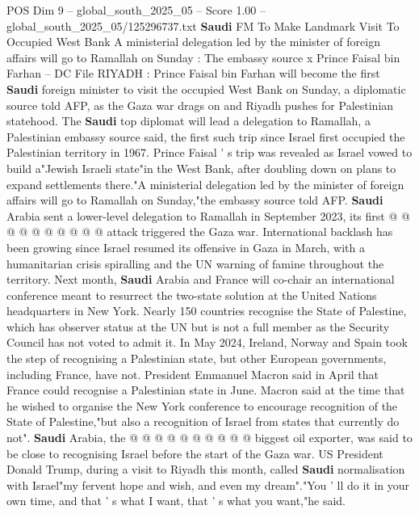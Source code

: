 \begin{textsample}{POS Dim 9 – global\_south\_2025\_05 – Score 1.00 – global\_south\_2025\_05/125296737.txt}  \label{ex:f9_pos_224}
\textbf{Saudi} FM To Make Landmark Visit To Occupied West Bank A ministerial delegation led by the minister of foreign affairs will go to Ramallah on Sunday : The embassy source x Prince Faisal bin Farhan -- DC File RIYADH : Prince Faisal bin Farhan will become the first \textbf{Saudi} foreign minister to visit the occupied West Bank on Sunday, a diplomatic source told AFP, as the Gaza war drags on and Riyadh pushes for Palestinian statehood.
The \textbf{Saudi} top diplomat will lead a delegation to Ramallah, a Palestinian embassy source said, the first such trip since Israel first occupied the Palestinian territory in 1967.
Prince Faisal ' s trip was revealed as Israel vowed to build a"Jewish Israeli state"in the West Bank, after doubling down on plans to expand settlements there."A ministerial delegation led by the minister of foreign affairs will go to Ramallah on Sunday,"the embassy source told AFP. \textbf{Saudi} Arabia sent a lower-level delegation to Ramallah in September 2023, its first @ @ @ @ @ @ @ @ @ @ attack triggered the Gaza war.
International backlash has been growing since Israel resumed its offensive in Gaza in March, with a humanitarian crisis spiralling and the UN warning of famine throughout the territory.
Next month, \textbf{Saudi} Arabia and France will co-chair an international conference meant to resurrect the two-state solution at the United Nations headquarters in New York.
Nearly 150 countries recognise the State of Palestine, which has observer status at the UN but is not a full member as the Security Council has not voted to admit it.
In May 2024, Ireland, Norway and Spain took the step of recognising a Palestinian state, but other European governments, including France, have not.
President Emmanuel Macron said in April that France could recognise a Palestinian state in June.
Macron said at the time that he wished to organise the New York conference to encourage recognition of the State of Palestine,"but also a recognition of Israel from states that currently do not". \textbf{Saudi} Arabia, the @ @ @ @ @ @ @ @ @ @ biggest oil exporter, was said to be close to recognising Israel before the start of the Gaza war.
US President Donald Trump, during a visit to Riyadh this month, called \textbf{Saudi} normalisation with Israel"my fervent hope and wish, and even my dream"."You ' ll do it in your own time, and that ' s what I want, that ' s what you want,"he said.

\end{textsample}

